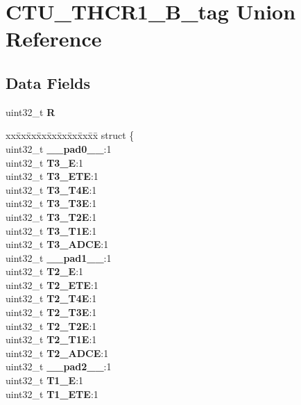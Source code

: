 \hypertarget{unionCTU__THCR1__32B__tag}{}\section{C\+T\+U\+\_\+\+T\+H\+C\+R1\+\_\+B\+\_\+tag Union Reference}
\label{unionCTU__THCR1__32B__tag}
\subsection*{Data Fields}
\begin{DoxyCompactItemize}
\item 
\mbox{\label{unionCTU__THCR1__32B__tag_a473bd4a463eeea631a37912b67fe5188}} 
uint32\+\_\+t {\bfseries R}
\item 
\mbox{\label{unionCTU__THCR1__32B__tag_ad208ed7aad1bfb6dd03d8662e13134e6}} 
\begin{tabbing}
xx\=xx\=xx\=xx\=xx\=xx\=xx\=xx\=xx\=\kill
struct \{\\
\>uint32\_t {\bfseries \_\_pad0\_\_}:1\\
\>uint32\_t {\bfseries T3\_E}:1\\
\>uint32\_t {\bfseries T3\_ETE}:1\\
\>uint32\_t {\bfseries T3\_T4E}:1\\
\>uint32\_t {\bfseries T3\_T3E}:1\\
\>uint32\_t {\bfseries T3\_T2E}:1\\
\>uint32\_t {\bfseries T3\_T1E}:1\\
\>uint32\_t {\bfseries T3\_ADCE}:1\\
\>uint32\_t {\bfseries \_\_pad1\_\_}:1\\
\>uint32\_t {\bfseries T2\_E}:1\\
\>uint32\_t {\bfseries T2\_ETE}:1\\
\>uint32\_t {\bfseries T2\_T4E}:1\\
\>uint32\_t {\bfseries T2\_T3E}:1\\
\>uint32\_t {\bfseries T2\_T2E}:1\\
\>uint32\_t {\bfseries T2\_T1E}:1\\
\>uint32\_t {\bfseries T2\_ADCE}:1\\
\>uint32\_t {\bfseries \_\_pad2\_\_}:1\\
\>uint32\_t {\bfseries T1\_E}:1\\
\>uint32\_t {\bfseries T1\_ETE}:1\\

\end{tabbing}
\end{DoxyCompactItemize}
